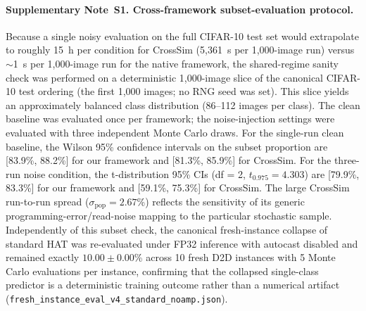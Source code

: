 \paragraph{Supplementary Note~S1. Cross-framework subset-evaluation protocol.}
Because a single noisy evaluation on the full CIFAR-10 test set would extrapolate to roughly 15~h per condition for CrossSim (5,361~s per 1,000-image run) versus $\sim$1~s per 1,000-image run for the native framework, the shared-regime sanity check was performed on a deterministic 1,000-image slice of the canonical CIFAR-10 test ordering (the first 1,000 images; no RNG seed was set). This slice yields an approximately balanced class distribution (86--112 images per class). The clean baseline was evaluated once per framework; the noise-injection settings were evaluated with three independent Monte Carlo draws. For the single-run clean baseline, the Wilson 95\% confidence intervals on the subset proportion are [83.9\%, 88.2\%] for our framework and [81.3\%, 85.9\%] for CrossSim. For the three-run noise condition, the t-distribution 95\% CIs (df = 2, $t_{0.975} = 4.303$) are [79.9\%, 83.3\%] for our framework and [59.1\%, 75.3\%] for CrossSim. The large CrossSim run-to-run spread ($\sigma_{\text{pop}} = 2.67$\%) reflects the sensitivity of its generic programming-error/read-noise mapping to the particular stochastic sample. Independently of this subset check, the canonical fresh-instance collapse of standard HAT was re-evaluated under FP32 inference with autocast disabled and remained exactly $10.00\pm0.00$\% across 10 fresh D2D instances with 5 Monte Carlo evaluations per instance, confirming that the collapsed single-class predictor is a deterministic training outcome rather than a numerical artifact (\texttt{fresh\_instance\_eval\_v4\_standard\_noamp.json}).

